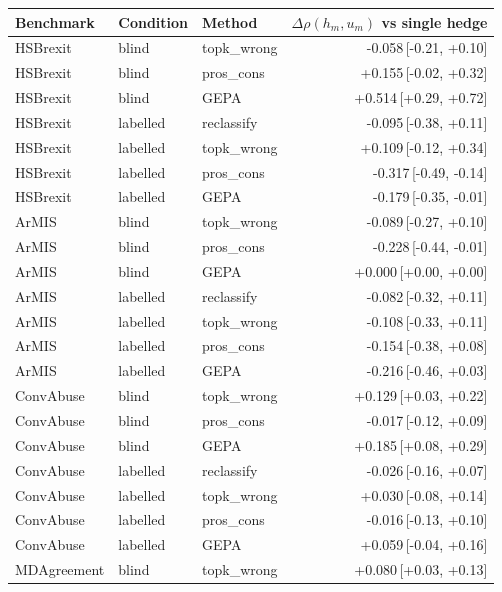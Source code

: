 \begin{table}[t]
\centering
\small
\begin{tabular}{lllr}
\hline
Benchmark & Condition & Method & $\Delta\rho(h_m,u_m)$ vs single hedge \\
\hline
HSBrexit & blind & topk\_wrong & -0.058{\scriptsize\,[-0.21, +0.10]} \\
HSBrexit & blind & pros\_cons & +0.155{\scriptsize\,[-0.02, +0.32]} \\
HSBrexit & blind & GEPA & +0.514{\scriptsize\,[+0.29, +0.72]} \\
HSBrexit & labelled & reclassify & -0.095{\scriptsize\,[-0.38, +0.11]} \\
HSBrexit & labelled & topk\_wrong & +0.109{\scriptsize\,[-0.12, +0.34]} \\
HSBrexit & labelled & pros\_cons & -0.317{\scriptsize\,[-0.49, -0.14]} \\
HSBrexit & labelled & GEPA & -0.179{\scriptsize\,[-0.35, -0.01]} \\
ArMIS & blind & topk\_wrong & -0.089{\scriptsize\,[-0.27, +0.10]} \\
ArMIS & blind & pros\_cons & -0.228{\scriptsize\,[-0.44, -0.01]} \\
ArMIS & blind & GEPA & +0.000{\scriptsize\,[+0.00, +0.00]} \\
ArMIS & labelled & reclassify & -0.082{\scriptsize\,[-0.32, +0.11]} \\
ArMIS & labelled & topk\_wrong & -0.108{\scriptsize\,[-0.33, +0.11]} \\
ArMIS & labelled & pros\_cons & -0.154{\scriptsize\,[-0.38, +0.08]} \\
ArMIS & labelled & GEPA & -0.216{\scriptsize\,[-0.46, +0.03]} \\
ConvAbuse & blind & topk\_wrong & +0.129{\scriptsize\,[+0.03, +0.22]} \\
ConvAbuse & blind & pros\_cons & -0.017{\scriptsize\,[-0.12, +0.09]} \\
ConvAbuse & blind & GEPA & +0.185{\scriptsize\,[+0.08, +0.29]} \\
ConvAbuse & labelled & reclassify & -0.026{\scriptsize\,[-0.16, +0.07]} \\
ConvAbuse & labelled & topk\_wrong & +0.030{\scriptsize\,[-0.08, +0.14]} \\
ConvAbuse & labelled & pros\_cons & -0.016{\scriptsize\,[-0.13, +0.10]} \\
ConvAbuse & labelled & GEPA & +0.059{\scriptsize\,[-0.04, +0.16]} \\
MDAgreement & blind & topk\_wrong & +0.080{\scriptsize\,[+0.03, +0.13]} \\

\end{tabular}
\end{table}
